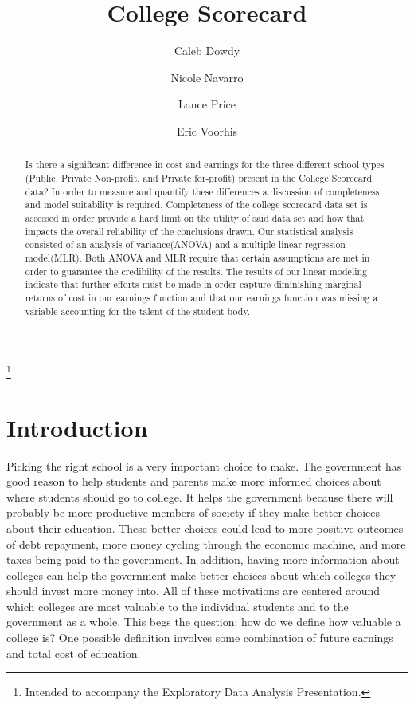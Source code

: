 \documentclass[%
 reprint,
 amsmath,amssymb,
 aps,
]{revtex4-1}
\begin{document}
\title{College Scorecard}%
\thanks{Intended to accompany the Exploratory Data Analysis Presentation.}%

\author{Caleb Dowdy}
\author{Nicole Navarro}
\author{Lance Price}
\author{Eric Voorhis}


\begin{abstract}
	Is there a significant difference in cost and earnings for the three different school types (Public, Private Non-profit, and Private for-profit) present in the College Scorecard data? In order to measure and quantify these differences a discussion of completeness and model suitability is required. Completeness of the college scorecard data set is assessed in order provide a hard limit on the utility of said data set and how that impacts the overall reliability of the conclusions drawn. Our statistical analysis consisted of an analysis of variance(ANOVA) and a multiple linear regression model(MLR). Both ANOVA and MLR require that certain assumptions are met in order to guarantee the credibility of the results. The results of our linear modeling indicate that further efforts must be made in order capture diminishing marginal returns of cost in our earnings function and that our earnings function was missing a variable accounting for the talent of the student body.
\end{abstract}

\maketitle

\section{\label{sec:level1}Introduction}
Picking the right school is a very important choice to make.  The government has good reason to help students and parents make more informed choices about where students should go to college.  It helps the government because there will probably be more productive members of society if they make better choices about their education.  These better choices could lead to more positive outcomes of debt repayment, more money cycling through the economic machine, and more taxes being paid to the government.  In addition, having more information about colleges can help the government make better choices about which colleges they should invest more money into.  All of these motivations are centered around which colleges are most valuable to the individual students and to the government as a whole.  This begs the question: how do we define how valuable a college is?  One possible definition involves some combination of future earnings and total cost of education.
\end{document}
